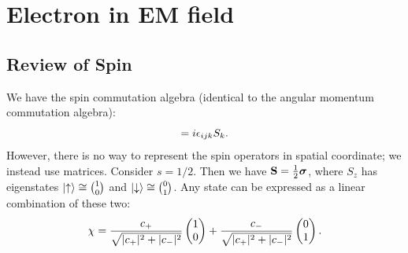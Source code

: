 \section{Electron in EM field}
\subsection{Review of Spin}
We have the spin commutation algebra (identical to the angular momentum commutation algebra):
\begin{equation}
    [S_i, S_j] = i\e_{ijk}S_k.
\end{equation}
However, there is no way to represent the spin operators in spatial coordinate; we instead use matrices. Consider $s = 1/2$. Then we have $\mathbf{S} = \frac{1}{2}\mbox{\boldmath$ \sigma $}$, where $S_z$ has eigenstates $\lvert \uparrow \rangle \cong \binom{1}{0}$ and $\lvert \downarrow \rangle \cong \binom{0}{1}$. Any state can be expressed as a linear combination of these two:
\begin{equation}
    \chi = \frac{c_+}{\sqrt{\lvert c_+ \rvert^2 + \lvert c_- \rvert^2}}\begin{pmatrix}1\\0\end{pmatrix} + \frac{c_-}{\sqrt{\lvert c_+ \rvert^2 + \lvert c_- \rvert^2}}\begin{pmatrix}0\\1\end{pmatrix}.
\end{equation}


